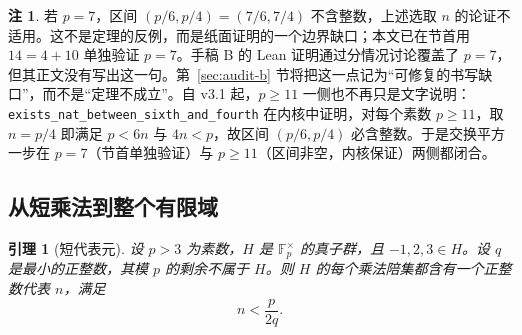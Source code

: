 \documentclass[11pt,a4paper]{ctexart}
\theoremstyle{plain}
\newtheorem{lemma}[theorem]{引理}
\theoremstyle{definition}
\newtheorem{remark}[theorem]{注}
\newcommand{\Fpx}{\mathbb{F}_p^{\times}}
\newcommand{\code}[1]{\texttt{#1}}
\begin{document}
\begin{remark}
若 $p=7$，区间 $(p/6,p/4)=(7/6,7/4)$ 不含整数，上述选取 $n$ 的论证不适用。这不是定理的反例，而是纸面证明的一个边界缺口；本文已在节首用 $14=4+10$ 单独验证 $p=7$。手稿 B 的 Lean 证明通过分情况讨论覆盖了 $p=7$，但其正文没有写出这一句。第~\ref{sec:audit-b} 节将把这一点记为“可修复的书写缺口”，而不是“定理不成立”。自 v3.1 起，$p\ge11$ 一侧也不再只是文字说明：\code{exists\_nat\_between\_sixth\_and\_fourth} 在内核中证明，对每个素数 $p\ge11$，取 $n=p/4$ 即满足 $p<6n$ 与 $4n<p$，故区间 $(p/6,p/4)$ 必含整数。于是交换平方一步在 $p=7$（节首单独验证）与 $p\ge11$（区间非空，内核保证）两侧都闭合。
\end{remark}

\subsection{从短乘法到整个有限域}
\label{sec:extension}

\begin{lemma}[短代表元]
\label{lem:short-rep}
设 $p>3$ 为素数，$H$ 是 $\Fpx$ 的真子群，且 $-1,2,3\in H$。设 $q$ 是最小的正整数，其模 $p$ 的剩余不属于 $H$。则 $H$ 的每个乘法陪集都含有一个正整数代表 $n$，满足
\begin{equation}
  n<\frac{p}{2q}.
  \label{eq:short}
\end{equation}
\end{lemma}
\end{document}

